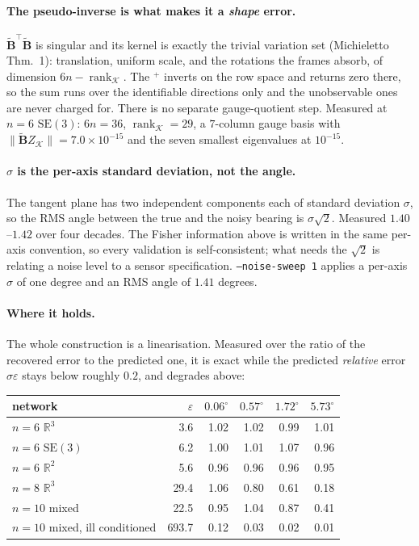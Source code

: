 \documentclass[11pt,a4paper]{article}
\newcommand{\R}{\mathbb{R}}
\newcommand{\SEthree}{\mathrm{SE}(3)}
\newcommand{\rk}{\operatorname{rank}}
\newcommand{\Bs}{\widetilde{\mathbf{B}}}
\begin{document}
\paragraph{The pseudo-inverse is what makes it a \emph{shape} error.}
$\Bs^{\!\top}\Bs$ is singular and its kernel is exactly the trivial variation set
(Michieletto Thm.\ 1): translation, uniform scale, and the rotations the frames absorb,
of dimension $6n-\rk_{\mathcal K}$. The ${}^{+}$ inverts on the row space and returns zero
there, so the sum runs over the identifiable directions only and the unobservable ones are
never charged for. There is no separate gauge-quotient step. Measured at $n{=}6$
$\SEthree$: $6n=36$, $\rk_{\mathcal K}=29$, a $7$-column gauge basis with
$\|\Bs Z_{\mathcal K}\|=7.0\times10^{-15}$ and the seven smallest eigenvalues at $10^{-15}$.

\paragraph{$\sigma$ is the per-axis standard deviation, not the angle.}
The tangent plane has two independent components each of standard deviation $\sigma$, so
the RMS angle between the true and the noisy bearing is $\sigma\sqrt2$. Measured
$1.40$--$1.42$ over four decades. The Fisher information above is written in the same
per-axis convention, so every validation is self-consistent; what needs the $\sqrt2$ is
relating a noise level to a sensor specification. \texttt{--noise-sweep 1} applies a
per-axis $\sigma$ of one degree and an RMS angle of $1.41$ degrees.

\paragraph{Where it holds.} The whole construction is a linearisation. Measured over the
ratio of the recovered error to the predicted one, it is exact while the predicted
\emph{relative} error $\sigma\varepsilon$ stays below roughly $0.2$, and degrades above:

\begin{center}
\begin{tabular}{lrrrrr}
\toprule
network & $\varepsilon$ & $0.06^\circ$ & $0.57^\circ$ & $1.72^\circ$ & $5.73^\circ$ \\
\midrule
$n{=}6$ $\R^3$   &  3.6 & 1.02 & 1.02 & 0.99 & 1.01 \\
$n{=}6$ $\SEthree$ & 6.2 & 1.00 & 1.01 & 1.07 & 0.96 \\
$n{=}6$ $\R^2$   &  5.6 & 0.96 & 0.96 & 0.96 & 0.95 \\
$n{=}8$ $\R^3$   & 29.4 & 1.06 & 0.80 & 0.61 & 0.18 \\
$n{=}10$ mixed   & 22.5 & 0.95 & 1.04 & 0.87 & 0.41 \\
$n{=}10$ mixed, ill conditioned & 693.7 & 0.12 & 0.03 & 0.02 & 0.01 \\
\bottomrule
\end{tabular}
\end{center}
\end{document}
